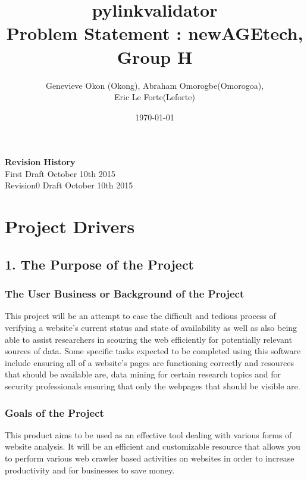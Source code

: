 \documentclass[titlepage]{article}
\begin{document}
\title{pylinkvalidator \\
 Problem Statement : newAGEtech, Group H }
\author{Genevieve Okon (Okong), Abraham Omorogbe(Omorogoa),\\
 Eric Le Forte(Leforte)}
\date{\today}
\maketitle


\tableofcontents
\listoffigures
\listoftables

\textbf{Revision History} \\ \normalsize
First Draft October 10th 2015\\
Revision0 Draft October 10th 2015\\
\clearpage

\section{Project Drivers}

\subsection{1. The Purpose of the Project}

\subsubsection*{The User Business or Background of the Project}
This project will be an attempt to ease the difficult and tedious process of verifying a website’s current status and state of availability as well as also being able to assist researchers in scouring the web efficiently for potentially relevant sources of data. Some specific tasks expected to be completed using this software include ensuring all of a website’s pages are functioning correctly and resources that should be available are, data mining for certain research topics and for security professionals ensuring that only the webpages that should be visible are.

\subsubsection*{Goals of the Project}
This product aims to be used as an effective tool dealing with various forms of website analysis. It will be an efficient and customizable resource that allows you to perform various web crawler based activities on websites in order to increase productivity and for businesses to save money.
\end{document}
